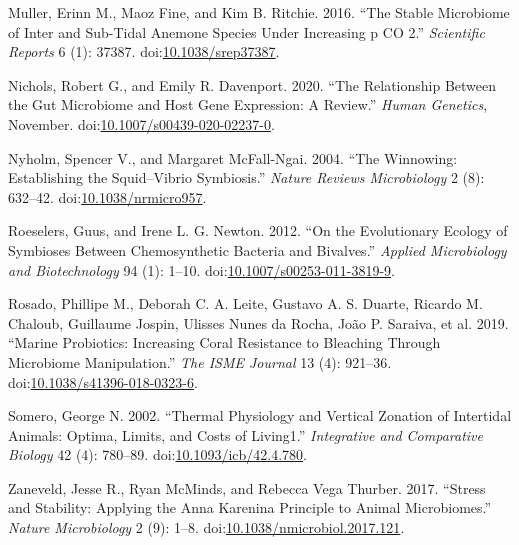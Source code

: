 \documentclass[
]{article}
\newlength{\cslhangindent}
\newlength{\cslentryspacingunit} %
\newenvironment{CSLReferences}[2] %
 {%
  \setlength{\parindent}{0pt}
  \ifodd #1
  \let\oldpar\par
  \def\par{\hangindent=\cslhangindent\oldpar}
  \fi
  \setlength{\parskip}{#2\cslentryspacingunit}
 }%
 {}
\begin{document}
\begin{CSLReferences}{1}{0}
\leavevmode{}%
Muller, Erinn M., Maoz Fine, and Kim B. Ritchie. 2016. {``The Stable
Microbiome of Inter and Sub-Tidal Anemone Species Under Increasing p
{CO} 2.''} \emph{Scientific Reports} 6 (1): 37387.
doi:\href{https://doi.org/10.1038/srep37387}{10.1038/srep37387}.

\leavevmode{}%
Nichols, Robert G., and Emily R. Davenport. 2020. {``The Relationship
Between the Gut Microbiome and Host Gene Expression: A Review.''}
\emph{Human Genetics}, November.
doi:\href{https://doi.org/10.1007/s00439-020-02237-0}{10.1007/s00439-020-02237-0}.

\leavevmode{}%
Nyholm, Spencer V., and Margaret McFall-Ngai. 2004. {``The Winnowing:
Establishing the Squid--Vibrio Symbiosis.''} \emph{Nature Reviews
Microbiology} 2 (8): 632--42.
doi:\href{https://doi.org/10.1038/nrmicro957}{10.1038/nrmicro957}.

\leavevmode{}%
Roeselers, Guus, and Irene L. G. Newton. 2012. {``On the Evolutionary
Ecology of Symbioses Between Chemosynthetic Bacteria and Bivalves.''}
\emph{Applied Microbiology and Biotechnology} 94 (1): 1--10.
doi:\href{https://doi.org/10.1007/s00253-011-3819-9}{10.1007/s00253-011-3819-9}.

\leavevmode{}%
Rosado, Phillipe M., Deborah C. A. Leite, Gustavo A. S. Duarte, Ricardo
M. Chaloub, Guillaume Jospin, Ulisses Nunes da Rocha, João P. Saraiva,
et al. 2019. {``Marine Probiotics: Increasing Coral Resistance to
Bleaching Through Microbiome Manipulation.''} \emph{The {ISME} Journal}
13 (4): 921--36.
doi:\href{https://doi.org/10.1038/s41396-018-0323-6}{10.1038/s41396-018-0323-6}.

\leavevmode{}%
Somero, George N. 2002. {``Thermal Physiology and Vertical Zonation of
Intertidal Animals: Optima, Limits, and Costs of Living1.''}
\emph{Integrative and Comparative Biology} 42 (4): 780--89.
doi:\href{https://doi.org/10.1093/icb/42.4.780}{10.1093/icb/42.4.780}.

\leavevmode{}%
Zaneveld, Jesse R., Ryan McMinds, and Rebecca Vega Thurber. 2017.
{``Stress and Stability: Applying the Anna Karenina Principle to Animal
Microbiomes.''} \emph{Nature Microbiology} 2 (9): 1--8.
doi:\href{https://doi.org/10.1038/nmicrobiol.2017.121}{10.1038/nmicrobiol.2017.121}.

\end{CSLReferences}
\end{document}
